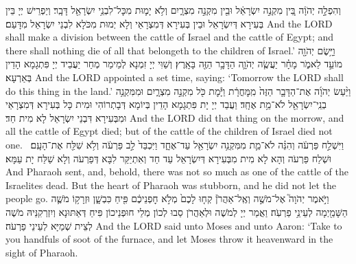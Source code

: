 {%
{וְהִפְלָ֣ה יְהֹוָ֔ה בֵּ֚ין מִקְנֵ֣ה יִשְׂרָאֵ֔ל וּבֵ֖ין מִקְנֵ֣ה מִצְרָ֑יִם וְלֹ֥א יָמ֛וּת מִכׇּל־לִבְנֵ֥י יִשְׂרָאֵ֖ל דָּבָֽר׃
}
{וְיַפְרֵישׁ יְיָ בֵּין בְּעִירָא דְּיִשְׂרָאֵל וּבֵין בְּעִירָא דְּמִצְרָאֵי וְלָא יְמוּת מִכֹּלָא לִבְנֵי יִשְׂרָאֵל מִדָּעַם׃}
{And the LORD shall make a division between the cattle of Israel and the cattle of Egypt; and there shall nothing die of all that belongeth to the children of Israel.’}{}
{וַיָּ֥שֶׂם יְהֹוָ֖ה מוֹעֵ֣ד לֵאמֹ֑ר מָחָ֗ר יַעֲשֶׂ֧ה יְהֹוָ֛ה הַדָּבָ֥ר הַזֶּ֖ה בָּאָֽרֶץ׃}
{וְשַׁוִּי יְיָ זִמְנָא לְמֵימַר מְחַר יַעֲבֵיד יְיָ פִּתְגָמָא הָדֵין בְּאַרְעָא׃}
{And the LORD appointed a set time, saying: ‘Tomorrow the LORD shall do this thing in the land.’}{}
{וַיַּ֨עַשׂ יְהֹוָ֜ה אֶת־הַדָּבָ֤ר הַזֶּה֙ מִֽמׇּחֳרָ֔ת וַיָּ֕מׇת כֹּ֖ל מִקְנֵ֣ה מִצְרָ֑יִם וּמִמִּקְנֵ֥ה בְנֵֽי־יִשְׂרָאֵ֖ל לֹא־מֵ֥ת אֶחָֽד׃}
{וַעֲבַד יְיָ יָת פִּתְגָמָא הָדֵין בְּיוֹמָא דְּבָתְרוֹהִי וּמִית כָּל בְּעִירָא דְּמִצְרָאֵי וּמִבְּעִירָא דִּבְנֵי יִשְׂרָאֵל לָא מִית חַד׃}
{And the LORD did that thing on the morrow, and all the cattle of Egypt died; but of the cattle of the children of Israel died not one.}{}
{וַיִּשְׁלַ֣ח פַּרְעֹ֔ה וְהִנֵּ֗ה לֹא־מֵ֛ת מִמִּקְנֵ֥ה יִשְׂרָאֵ֖ל עַד־אֶחָ֑ד וַיִּכְבַּד֙ לֵ֣ב פַּרְעֹ֔ה וְלֹ֥א שִׁלַּ֖ח אֶת־הָעָֽם׃ \petucha }
{וּשְׁלַח פַּרְעֹה וְהָא לָא מִית מִבְּעִירָא דְּיִשְׂרָאֵל עַד חַד וְאִתְיַקַּר לִבָּא דְּפַרְעֹה וְלָא שַׁלַּח יָת עַמָּא׃}
{And Pharaoh sent, and, behold, there was not so much as one of the cattle of the Israelites dead. But the heart of Pharaoh was stubborn, and he did not let the people go.}{}
{וַיֹּ֣אמֶר יְהֹוָה֮ אֶל־מֹשֶׁ֣ה וְאֶֽל־אַהֲרֹן֒ קְח֤וּ לָכֶם֙ מְלֹ֣א חׇפְנֵיכֶ֔ם פִּ֖יחַ כִּבְשָׁ֑ן וּזְרָק֥וֹ מֹשֶׁ֛ה הַשָּׁמַ֖יְמָה לְעֵינֵ֥י פַרְעֹֽה׃
\rashi{}}
{וַאֲמַר יְיָ לְמֹשֶׁה וּלְאַהֲרֹן סַבוּ לְכוֹן מְלֵי חוּפְנֵיכוֹן פִּיחַ דְּאַתּוּנָא וְיִזְרְקִנֵּיהּ מֹשֶׁה לְצֵית שְׁמַיָּא לְעֵינֵי פַרְעֹה׃}
{And the LORD said unto Moses and unto Aaron: ‘Take to you handfuls of soot of the furnace, and let Moses throw it heavenward in the sight of Pharaoh.}{}
}
